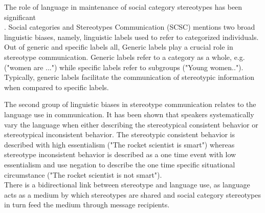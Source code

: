 The role of language in maintenance of social category stereotypes has been significant
\\
\cite{burgers2020language}.
 Social categories and Stereotypes Communication (SCSC) 
 \cite{beukeboom2019stereotypes} mentions two broad linguistic biases, namely, linguistic labels used to refer to categorized individuals. Out of generic and specific labels all, Generic labels play a crucial role in stereotype communication\cite{burgers2020language}. Generic labels refer to a category as a whole, e.g.("women are ...") while specific labels refer to subgroups ("Young women.."). Typically, generic labels facilitate the communication of stereotypic information when compared to specific labels\cite{burgers2020language}. 
 
 The second group of linguistic biases in stereotype communication relates to the language use in communication\cite{beukeboom2019stereotypes}. It has been shown that speakers systematically vary the language when either describing the stereotypical consistent behavior or stereotypical inconsistent behavior. The stereotypic consistent behavior is described with high essentialism  ("The rocket scientist is smart") whereas stereotype inconsistent behavior is described as a one time event with low essentialism and use negation to describe the one time specific situational circumstance ("The rocket scientist is not smart")\cite{burgers2020language}.  
 \\
There is a bidirectional link between stereotype and language use, as language acts as a medium by which stereotypes are shared and social category stereotypes in turn feed the medium through message recipients\cite{burgers2020language}. 

